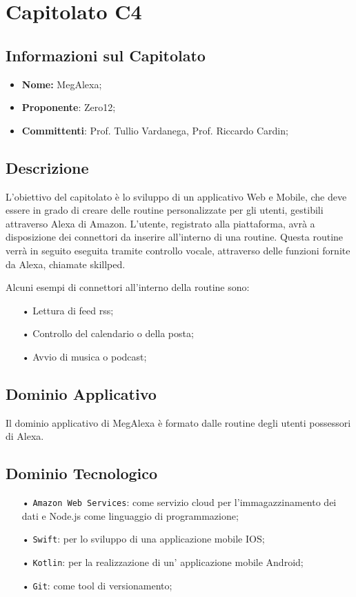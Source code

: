 \section{Capitolato C4}
\subsection{Informazioni sul Capitolato}
\begin{itemize}
	\item \textbf{Nome:} MegAlexa;
	\item \textbf{Proponente}: Zero12;
	\item \textbf{Committenti}: Prof. Tullio Vardanega, Prof. Riccardo Cardin;
\end{itemize}

\subsection{Descrizione}
L'obiettivo del capitolato è lo sviluppo di un applicativo Web e Mobile, che deve essere in grado di creare delle routine personalizzate per gli utenti, gestibili attraverso Alexa di Amazon.
L'utente, registrato alla piattaforma, avrà a disposizione dei connettori da inserire all'interno di una routine. Questa routine verrà in seguito eseguita tramite controllo vocale, attraverso delle funzioni fornite da Alexa, chiamate skillped.

Alcuni esempi di connettori all'interno della routine sono:
\begin{itemize}
\item[•] Lettura di feed rss;
\item[•] Controllo del calendario o della posta;
\item[•] Avvio di musica o podcast;
\end{itemize}

\subsection{Dominio Applicativo}
Il dominio applicativo di MegAlexa è formato dalle routine degli utenti possessori di Alexa.

\subsection{Dominio Tecnologico}
\begin{itemize}

\item[•] \texttt{Amazon Web Services}: come servizio cloud per l'immagazzinamento dei dati e Node.js come linguaggio di programmazione;
\item[•] \texttt{Swift}: per lo sviluppo di una applicazione mobile IOS;
\item[•] \texttt{Kotlin}: per la realizzazione di un' applicazione mobile Android;
\item[•] \texttt{Git}: come tool di versionamento;

\end{itemize}


